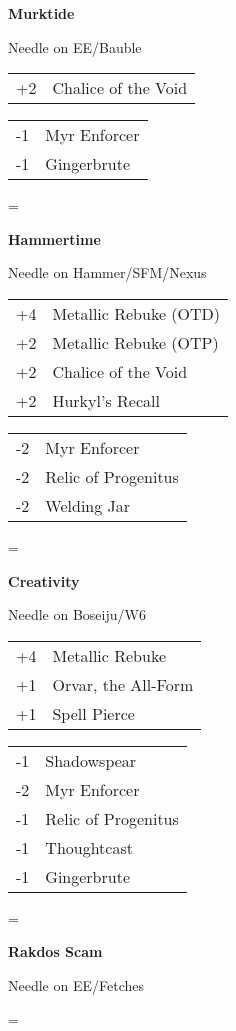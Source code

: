 \documentclass[fontsize=12pt,paper=a4]{scrartcl}
\newenvironment{absolutelynopagebreak}
  {\par\nobreak\vfil\penalty0\vfilneg
   \vtop\bgroup}
  {\par\xdef\tpd{\the\prevdepth}\egroup
   \prevdepth=\tpd}
\newenvironment{decklist}{%
    \begin{tabular}{>{\hspace{-4pt}}r<{\hspace{-3pt}}>{\hspace{-3pt}}l<{\hspace{-4pt}}}
    }{%
    \end{tabular}
    \par
}
\newcommand{\card}[2]{#1 & #2\\}
\newenvironment{sideboardguide}{%
    \newpage
    \begin{multicols}{4}
        \begin{tiny}
        }{%
        \end{tiny}
    \end{multicols}
}
\newenvironment{matchup}[1]{%
    \begin{absolutelynopagebreak}
        \textbf{#1}\par
    }{%
    \end{absolutelynopagebreak}
    \par\vspace{2em}
}
\newenvironment{notes}{%
}{%
    \par
}
\begin{document}
\begin{sideboardguide}
    \begin{matchup}{Murktide}
        \begin{notes}
            Needle on EE/Bauble
        \end{notes}
        \begin{decklist}
            \card{+2}{Chalice of the Void}
        \end{decklist}
        \begin{decklist}
            \card{-1}{Myr Enforcer}
            \card{-1}{Gingerbrute}
        \end{decklist}
    \end{matchup}
    \begin{matchup}{Hammertime}
        \begin{notes}
            Needle on Hammer/SFM/Nexus
        \end{notes}
        \begin{decklist}
            \card{+4}{Metallic Rebuke (OTD)}
            \card{+2}{Metallic Rebuke (OTP)}
            \card{+2}{Chalice of the Void}
            \card{+2}{Hurkyl's Recall}
        \end{decklist}
        \begin{decklist}
            \card{-2}{Myr Enforcer}
            \card{-2}{Relic of Progenitus}
            \card{-2}{Welding Jar}
        \end{decklist}
    \end{matchup}
    \begin{matchup}{Creativity}
        \begin{notes}
            Needle on Boseiju/W6
        \end{notes}
        \begin{decklist}
            \card{+4}{Metallic Rebuke}
            \card{+1}{Orvar, the All-Form}
            \card{+1}{Spell Pierce}
        \end{decklist}
        \begin{decklist}
            \card{-1}{Shadowspear}
            \card{-2}{Myr Enforcer}
            \card{-1}{Relic of Progenitus}
            \card{-1}{Thoughtcast}
            \card{-1}{Gingerbrute}
        \end{decklist}
    \end{matchup}
    \begin{matchup}{Rakdos Scam}
        \begin{notes}
            Needle on EE/Fetches
        \end{notes}

\end{matchup}
\end{sideboardguide}
\end{document}
